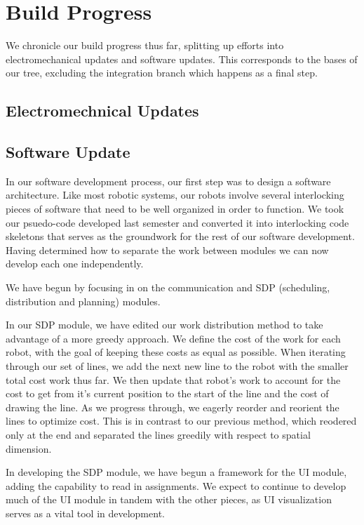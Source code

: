 
\section{Build Progress}
\label{sec:build_progress}

We chronicle our build progress thus far, splitting up efforts into electromechanical updates and software updates. This corresponds to the bases of our tree, excluding the integration branch which happens as a final step. 

\subsection{Electromechnical Updates}
\label{sec:electromechanical_progress}



\subsection{Software Update}
\label{sec:software_progress}

In our software development process, our first step was to design a software architecture. Like most robotic systems, our robots involve several interlocking pieces of software that need to be well organized in order to function. We took our psuedo-code developed last semester and converted it into interlocking code skeletons that serves as the groundwork for the rest of our software development. Having determined how to separate the work between modules we can now develop each one independently. 

We have begun by focusing in on the communication and SDP (scheduling, distribution and planning) modules. 

In our SDP module, we have edited our work distribution method to take advantage of a more greedy approach. We define the cost of the work for each robot, with the goal of keeping these costs as equal as possible. When iterating through our set of lines, we add the next new line to the robot with the smaller total cost work thus far. We then update that robot's work to account for the cost to get from it's current position to the start of the line and the cost of drawing the line. As we progress through, we eagerly reorder and reorient the lines to optimize cost. This is in contrast to our previous method, which reodered only at the end and separated the lines greedily with respect to spatial dimension. 

In developing the SDP module, we have begun a framework for the UI module, adding the capability to read in assignments. We expect to continue to develop much of the UI module in tandem with the other pieces, as UI visualization serves as a vital tool in development. 
